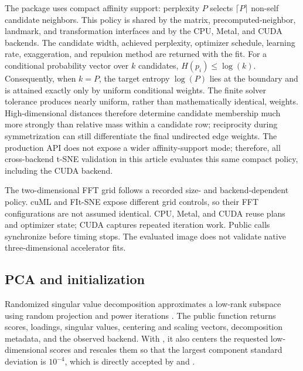 \documentclass[article]{jss}
\begin{document}
The package uses compact affinity support: perplexity $P$ selects
$\lceil P \rceil$ non-self candidate neighbors. This policy is shared by the
matrix, precomputed-neighbor, landmark, and transformation interfaces and by
the CPU, Metal, and CUDA backends. The candidate width, achieved perplexity,
optimizer schedule, learning rate, exaggeration, and repulsion method are
returned with the fit.
For a conditional probability vector over $k$ candidates,
$H(p_i) \leq \log(k)$. Consequently, when $k=P$, the target entropy
$\log(P)$ lies at the boundary and is attained exactly only by uniform
conditional weights. The finite solver tolerance produces nearly uniform,
rather than mathematically identical, weights. High-dimensional distances
therefore determine candidate membership much more strongly than relative
mass within a candidate row; reciprocity during symmetrization can still
differentiate the final undirected edge weights.
The production API does not expose a wider affinity-support mode; therefore,
all cross-backend t-SNE validation in this article evaluates this same compact
policy, including the CUDA backend.

The two-dimensional FFT grid follows a recorded size- and backend-dependent
policy. cuML and FIt-SNE expose different grid controls, so their FFT
configurations are not assumed identical. CPU, Metal, and CUDA reuse plans
and optimizer state; CUDA captures repeated iteration work. Public calls
synchronize before timing stops. The evaluated image does not validate
native three-dimensional accelerator fits.

\subsection{PCA and initialization}

Randomized singular value decomposition approximates a low-rank subspace using
random projection and power iterations \citep{halko2011}. The public
 function returns scores, loadings, singular values,
centering and scaling vectors, decomposition metadata, and the observed
backend. With
, it also centers the requested low-dimensional scores
and rescales them so that the largest component standard deviation is
$10^{-4}$, which is directly accepted by  and
.
\end{document}
